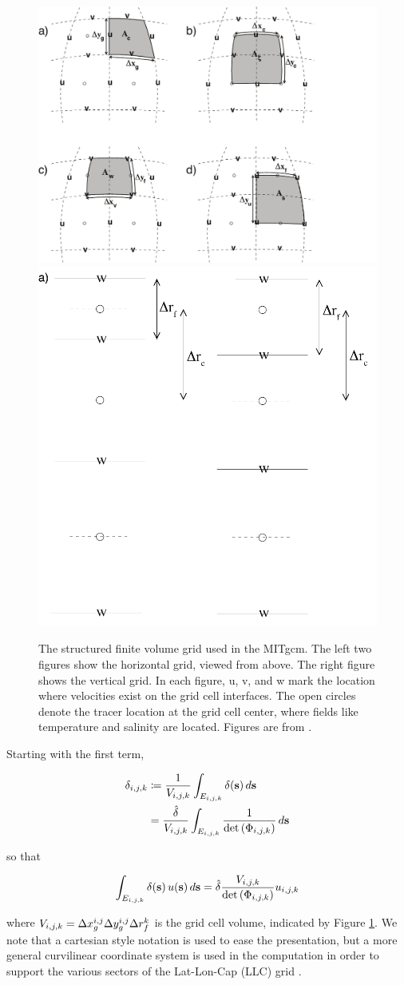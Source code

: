 \begin{figure}
    \centering
    \includegraphics[width=.6\textwidth]{../figures/hgrid-abcd.pdf}
    \includegraphics[width=.2\textwidth]{../figures/vgrid-accur-center.pdf}
    \caption{The structured finite volume grid used in the MITgcm. The
        left two figures show the horizontal grid, viewed from above. The right
        figure shows the vertical grid. In each figure, u, v, and w mark the
        location where velocities exist on the grid cell interfaces. The open
        circles denote the tracer location at the grid cell center,
        where fields like temperature and salinity are located. Figures are from
    \citet{campin_mitgcmmitgcm_2021}.}
    \label{fig:mitgcm_grid}
\end{figure}

Starting with the first term,
\begin{linenomath*}\begin{equation*}
    \begin{aligned}
        \delta_{i,j,k} &\coloneqq \dfrac{1}{V_{i,j,k}}\int_{E_{i,j,k}}\delta(\mathbf{s})\,d\mathbf{s}
        \\
                   &=
                   \dfrac{\hat{\delta}}{V_{i,j,k}}\int_{E_{i,j,k}}\dfrac{1}{\text{det}\left(\Phi_{{i,j,k}}\right)}\,d\mathbf{s}
    \end{aligned}
\end{equation*}\end{linenomath*}
so that
\begin{linenomath*}\begin{equation*}
    \int_{E_{i,j,k}} \delta(\mathbf{s})\,u(\mathbf{s})\, d\mathbf{s} =
    \hat{\delta}\dfrac{V_{i,j,k}}{\text{det}\left(\Phi_{{i,j,k}}\right)}u_{i,j,k}
\end{equation*}\end{linenomath*}
where $V_{i,j,k} = \Delta x ^{i,j}_{g} \Delta y^{i,j}_{g} \Delta r_f^k$ is the grid cell volume,
indicated by Figure \ref{fig:mitgcm_grid}.
We note that a cartesian style notation
is used to ease the presentation, but a more general curvilinear coordinate system
is used in the computation in order to support the various sectors of the
Lat-Lon-Cap (LLC) grid
\citep[see Section 2 and Appendix A of][for more details on the LLC grid]{forgetECCOv4}.

